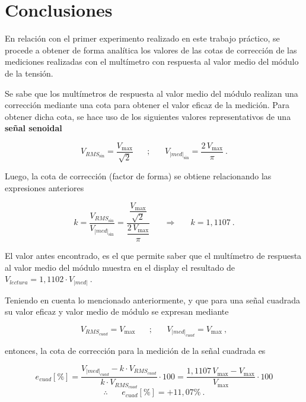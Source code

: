   \pagebreak
  \section{Conclusiones}
    En relación con el primer experimento realizado en este trabajo
    práctico, se procede a obtener de forma analítica los valores
    de las cotas de corrección de las mediciones realizadas con
    el multímetro con respuesta al valor medio del módulo de la 
    tensión.
    
    Se sabe que los multímetros de respuesta al valor medio del
    módulo realizan una corrección mediante una cota para obtener 
    el valor eficaz de la medición. Para obtener dicha cota, se 
    hace uso de los siguientes valores representativos de una 
    \textbf{señal senoidal}

    \vspace{-5pt}
    $$ V_{RMS_{\sin}} = \dfrac{V_{\max}}{\sqrt{2}} \hspace{20pt} ; 
    \hspace{20pt} V_{|med|_{\sin}} = \dfrac{2\, V_{\max}}{\pi}~. $$

    \noindent Luego, la cota de corrección (factor de forma) se obtiene
    relacionando las expresiones anteriores
    
    \vspace{-5pt}
     $$ k = \dfrac{V_{RMS_{\sin}}}{V_{|med|_{\sin}}} 
        = \dfrac{\dfrac{V_{\max}}{\sqrt{2}}}{\dfrac{2\, V_{\max}}{\pi}}
        \hspace{20pt} \Longrightarrow \hspace{20pt} k = 1,1107~.$$

    El valor antes encontrado, es el que permite saber que el multímetro
    de respuesta al valor medio del módulo muestra en el display el 
    resultado de $ V_{lectura} = 1,1102 \cdot V_{|med|}~. $

    Teniendo en cuenta lo mencionado anteriormente, y que para una señal cuadrada
    su valor eficaz y valor medio de módulo se expresan mediante

    \vspace{-5pt}
    $$ V_{RMS_{cuad}} = V_{\max} \hspace{20pt} ; \hspace{20pt} V_{|med|_{cuad}} = V_{\max}~, $$

    \noindent entonces, la cota de corrección para la medición de 
    la señal cuadrada es

    \vspace{-5pt}
    $$ e_{cuad} [\%] = \dfrac{V_{|med|_{cuad}} - k\cdot V_{RMS_{cuad}}}{k \cdot V_{RMS_{cuad}}} \cdot 100
              = \dfrac{1,1107\, V_{\max} - V_{\max}}{V_{\max}} \cdot 100 $$
              $$  \therefore \hspace{20pt} \boxed{e_{cuad}[\%] = +11,07\%}~.
    $$

